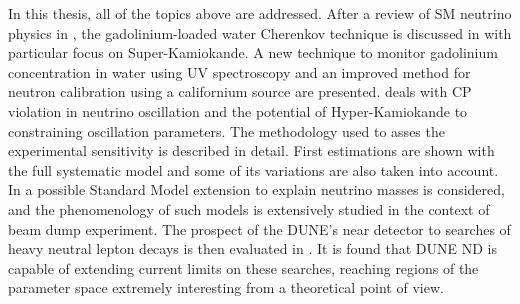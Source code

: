 In this thesis, all of the topics above are addressed.
After a review of SM neutrino physics in , the gadolinium-loaded water Cherenkov technique %
is discussed in  with particular focus on Super-Kamiokande.
A new technique to monitor gadolinium concentration in water using UV spectroscopy %
and an improved method for neutron calibration using a californium source are presented.
 deals with CP violation in neutrino oscillation and the potential of Hyper-Kamiokande to %
constraining oscillation parameters.
The methodology used to asses the experimental sensitivity is described in detail.
First estimations are shown with the full systematic model and some of its variations are also taken into account.
In  a possible Standard Model extension to explain neutrino masses is considered, %
and the phenomenology of such models is extensively studied in the context of beam dump experiment.
The prospect of the DUNE's near detector to searches of heavy neutral lepton decays is then evaluated in .
It is found that DUNE ND is capable of extending current limits on these searches, %
reaching regions of the parameter space extremely interesting from a theoretical point of view.
